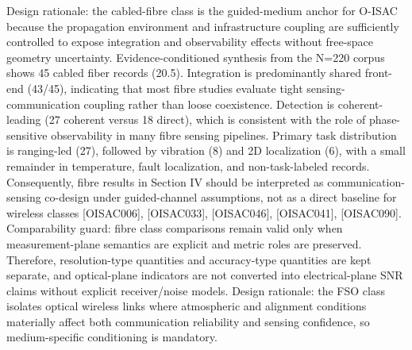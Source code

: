 {}\markdownRendererSectionBegin
{}\markdownRendererInterblockSeparator
{}Design rationale: the cabled-fibre class is the guided-medium anchor for O-ISAC because the propagation environment and infrastructure coupling are sufficiently controlled to expose integration and observability effects without free-space geometry uncertainty.\markdownRendererParagraphSeparator
{}Evidence-conditioned synthesis from the N=220 corpus shows 45 cabled fiber records (20.5\markdownRendererPercentSign{}). Integration is predominantly shared front-end (43/45), indicating that most fibre studies evaluate tight sensing-communication coupling rather than loose coexistence. Detection is coherent-leading (27 coherent versus 18 direct), which is consistent with the role of phase-sensitive observability in many fibre sensing pipelines. Primary task distribution is ranging-led (27), followed by vibration (8) and 2D localization (6), with a small remainder in temperature, fault localization, and non-task-labeled records. Consequently, fibre results in Section IV should be interpreted as communication-sensing co-design under guided-channel assumptions, not as a direct baseline for wireless classes [O\markdownRendererUnderscore{}ISAC\markdownRendererUnderscore{}006], [O\markdownRendererUnderscore{}ISAC\markdownRendererUnderscore{}033], [O\markdownRendererUnderscore{}ISAC\markdownRendererUnderscore{}046], [O\markdownRendererUnderscore{}ISAC\markdownRendererUnderscore{}041], [O\markdownRendererUnderscore{}ISAC\markdownRendererUnderscore{}090].\markdownRendererParagraphSeparator
{}Comparability guard: fibre class comparisons remain valid only when measurement-plane semantics are explicit and metric roles are preserved. Therefore, resolution-type quantities and accuracy-type quantities are kept separate, and optical-plane indicators are not converted into electrical-plane SNR claims without explicit receiver/noise models.\markdownRendererInterblockSeparator
{}
\markdownRendererSectionEnd \markdownRendererSectionBegin
{}\markdownRendererInterblockSeparator
{}Design rationale: the FSO class isolates optical wireless links where atmospheric and alignment conditions materially affect both communication reliability and sensing confidence, so medium-specific conditioning is mandatory.\markdownRendererParagraphSeparator
